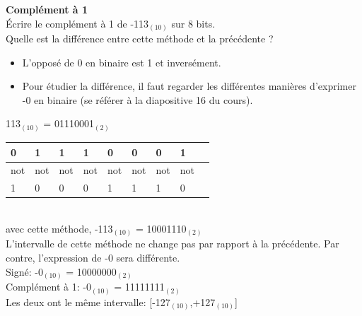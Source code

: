 \begin{Exercice}[5 minutes] \textbf{Complément à 1}\\
    Écrire le complément à 1 de -113$_{(10)}$ sur 8 bits. \\

	Quelle est la différence entre cette méthode et la précédente ?

    \begin{conseil}
        \begin{itemize}
        	\item L'opposé de 0 en binaire est 1 et inversément.
        	\item Pour étudier la différence, il faut regarder les différentes manières d'exprimer -0 en binaire (se référer à la diapositive 16 du cours).
        \end{itemize} 
    \end{conseil}
    
    \begin{solution}
    	113$_{(10)}$ = 01110001$_{(2)}$ \\
    	
        \begin{tabular}{| p{1cm} | p{1cm} | p{1cm} | p{1cm} | p{1cm} | p{1cm} | p{1cm} | p{1cm} | p{1cm} |} 
            \hline
            0 & 1 & 1 & 1 & 0 & 0 & 0 & 1 \\ [0.5ex] 
            \hline
            not & not & not & not & not & not & not & not \\ [0.5ex]
            \hline
            1 & 0 & 0 & 0 & 1 & 1 & 1 & 0 \\ [0.5ex]
            \hline
        \end{tabular} \\
        
        avec cette méthode, -113$_{(10)}$ = 10001110$_{(2)}$ \\
        
        L'intervalle de cette méthode ne change pas par rapport à la précédente. Par contre, l'expression de -0 sera différente.\\
        
        Signé: -0$_{(10)}$ = 10000000$_{(2)}$ \\
        
        Complément à 1: -0$_{(10)}$ = 11111111$_{(2)}$ \\
        
        Les deux ont le même intervalle: [-127$_{(10)}$,+127$_{(10)}$] \\
        
    \end{solution}
\end{Exercice}

